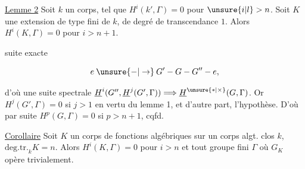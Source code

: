 
\uline{Lemme 2} Soit $k$ un corps, tel que $H^i(k',\Gamma)=0$ pour $\unsure{i|l}>n$.  Soit $K$ une extension de  type fini de $k$, de degré de transcendance $1$. Alors $H^i(K,\Gamma)=0$ pour $i>n+1$.


  suite exacte

\[
e \mathbin{\unsure{-|\to}} G' - G - G'' - e,
\]

d'où une suite spectrale $\underline{H}^i(G'',\underline{H}^j(G',\Gamma))\Longrightarrow\underline{H}^{\unsure{*|\times}}(G,\Gamma)$. Or $H^j(G',\Gamma)=0$ si $j>1$ en vertu du lemme 1, et d'autre part,   l'hypothèse. D'où par suite $H^p(G,\Gamma)=0$ si $p>n+1$, cqfd.

\uline{Corollaire} Soit $K$ un corps de fonctions algébriques sur un corps algt. clos $k$, $\mathrm{deg.tr.}_k K=n$. Alors $H^i(K,\Gamma)=0$ pour $i>n$ et tout groupe  fini $\Gamma$ où $G_K$ opère trivialement.
